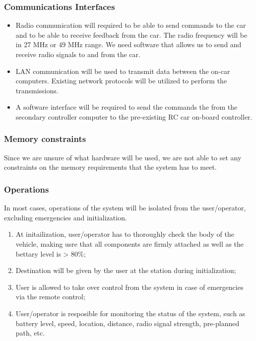 \documentclass[compsoc,draftclsnofoot,onecolumn,10pt]{IEEEtran}
\begin{document}
\subsubsection{Communications Interfaces} %
\begin{itemize}
	\item Radio communication will required to be able to send commands to the car and
	to be able to receive feedback from the car. The radio frequency will be in 27
	MHz or 49 MHz range. We need software that allows us to send and receive radio
	signals to and from the car. 
	
	\item LAN communication will be used to transmit data between the on-car computers.
	Existing network protocols will be utilized to perform the transmissions.
	
	\item A software interface will be required to send the commands the from the
	secondary controller computer to the pre-existing RC car on-board controller.
	
\end{itemize}


\subsubsection{Memory constraints} %
Since we are unsure of what hardware will be used, we are not able to set any 
constraints on the memory requirements that the system has to meet. 

\subsubsection{Operations} %
In most cases, operations of the system will be isolated from the user/operator,
excluding emergencies and initialization.  
\begin{enumerate}
	\item At initailization, user/operator has to thoroughly check the body of the
	vehicle, making usre that all components are firmly attached as well as the 
	bettary level is > 80\%;
	\item Destination will be given by the user at the station during initialization;
	\item User is allowed to take over control from the system in case of emergencies
	via the remote control;
	\item User/operator is resposible for monitoring the status of the system, such as 
	battery level, speed, location, distance, radio signal strength, pre-planned path, 
	etc.
\end{enumerate}
\end{document}
